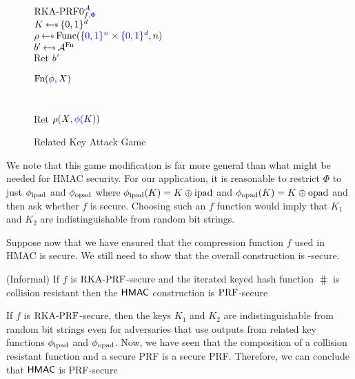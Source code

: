 \begin{figure}[h]
\centering
{}
{
    \underline{$\text{RKA-PRF0}^{\mathcal A}_{f, {\color{blue} \Phi }}$}\\[1pt]
    $K \getsr \bits^d$\\
    $\rho \getsr \Func(\modify{\bits^n \times \bits^d},n)$\\
    $b' \getsr \advA^{\FnOracle}$\\
    Ret $b'$\medskip

    \underline{$\textnormal{Fn}({\color{blue} \phi }, X)$}\\
    \\
    \\
    Ret $\rho(X {\color{blue} , \phi(K) })$\medskip
}
\caption{Related Key Attack Game} \label{fig:RKA}
\end{figure}



We note that this game modification is far more general than what might be needed for HMAC security. For our application, it is reasonable to restrict $\Phi$ to just $\phi_{\mathrm{ipad}}$ and $\phi_{\mathrm{opad}}$ where $\phi_{\mathrm{ipad}}(K) = K \oplus \mathrm{ipad}$ and $\phi_{\mathrm{opad}}(K) = K \oplus \mathrm{opad}$ and then ask whether $f$ is \RKAPRF secure. Choosing such an $f$ function would imply that $K_1$ and $K_2$ are indistinguishable from random bit strings. 

Suppose now that we have ensured that the compression function $f$ used in HMAC is \RKAPRF secure. We still need to show that the overall construction is \PRF-secure. 

\begin{lemma}
(Informal) If $f$ is $\textnormal{RKA-PRF}$-secure and the iterated keyed hash function $\hash$ is collision resistant then the $\textnormal{\textsf{HMAC}}$ construction is $\textnormal{PRF}$-secure
\end{lemma}
\begin{proofsketch}
If $f$ is $\textnormal{RKA-PRF}$-secure, then the keys $K_1$ and $K_2$ are indistinguishable from random bit strings even for adversaries that use outputs from related key functions $\phi_{\mathrm{ipad}}$ and $\phi_{\mathrm{opad}}$. Now, we have seen that the composition of a collision resistant function and a secure PRF is a secure PRF. Therefore, we can conclude that $\textnormal{\textsf{HMAC}}$ is PRF-secure
\end{proofsketch}


